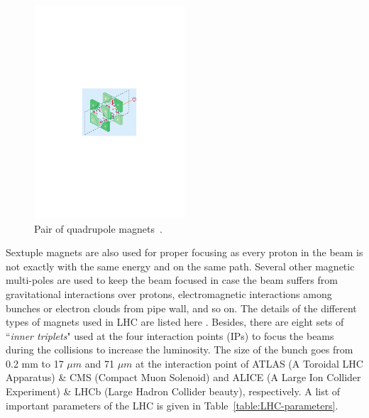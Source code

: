 \begin{figure}[!htbp]
	\centering
	\includegraphics[width=0.50\textwidth]{figures/LHC/quadrupole_magnet_pair.pdf}
	\caption{Pair of quadrupole magnets~\cite{Vidal}.}
	\label{fig:QuadrupoleMagnet}
\end{figure}

Sextuple magnets are also used for proper focusing as every proton in the beam is not exactly with the same energy and on the same path. 
Several other magnetic multi-poles are used to keep the beam focused  in case the beam suffers from gravitational interactions over protons, electromagnetic interactions among bunches or electron clouds from pipe wall, and so on.
The details of the different types of magnets used in LHC are listed here \cite{WebLink:LHC_magnets}.
Besides, there are eight sets of ``\textit{inner triplets}" used at the four interaction points (IPs) to focus the beams during the collisions to increase the luminosity. The size of the bunch goes from 0.2 mm to 17 $\mu m$ and 71 $\mu m$ at the interaction point of ATLAS (A Toroidal LHC Apparatus) \& CMS (Compact Muon Solenoid) and ALICE (A Large Ion Collider Experiment) \& LHCb (Large Hadron Collider beauty), respectively. A list of important parameters of the LHC is given in Table~\ref{table:LHC-parameters}.

